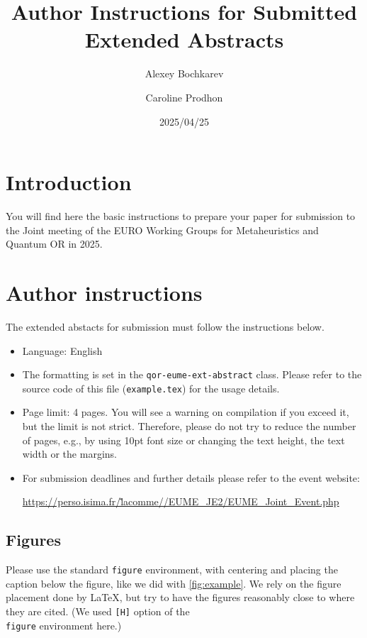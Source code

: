 \documentclass{qor-eume-ext-abstract}
\title{Author Instructions for Submitted Extended Abstracts}
\author[1]{Alexey Bochkarev}
\author[2]{Caroline Prodhon}
\date{2025/04/25}
\begin{document}
\maketitle

\section{Introduction}
You will find here the basic instructions to prepare your paper for submission
to the Joint meeting of the EURO Working Groups for Metaheuristics and Quantum
OR in 2025.

\section{Author instructions}
The extended abstacts for submission must follow the instructions below.

\begin{itemize}
  \item Language: English
  \item The formatting is set in the \texttt{qor-eume-ext-abstract} class.
        Please refer to the source code of this file (\texttt{example.tex}) for
        the usage details.
  \item Page limit: 4 pages. You will see a warning on compilation if you exceed
        it, but the limit is not strict. Therefore, please do not try to reduce
        the number of pages, e.g., by using 10pt font size or changing the text height,
        the text width or the margins.
  \item For submission deadlines and further details please refer to the event
        website:
        \begin{center} \href{https://perso.isima.fr/~lacomme/EUME_JE2/EUME_Joint_Event.php}{https://perso.isima.fr/\~lacomme//EUME\_JE2/EUME\_Joint\_Event.php}
        \end{center}
\end{itemize}

\subsection{Figures}
Please use the standard \texttt{figure} environment, with centering and placing
the caption below the figure, like we did with \cref{fig:example}. We rely on
the figure placement done by \LaTeX, but try to have the figures reasonably
close to where they are cited. (We used \texttt{[H]} option of the
\texttt{\\figure} environment here.)
\end{document}
